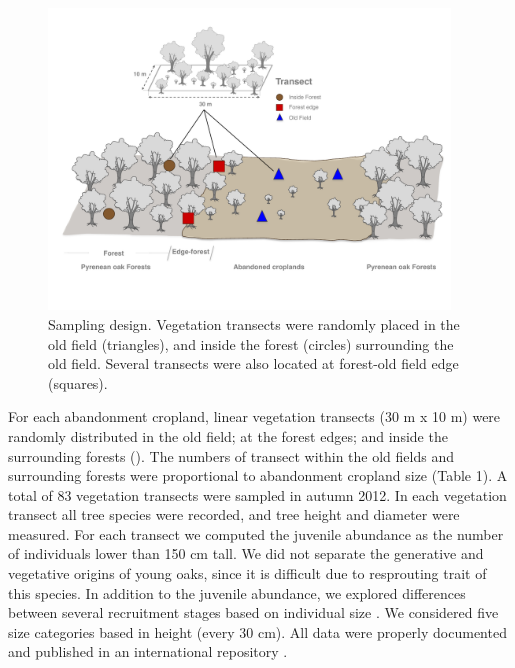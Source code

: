 \begin{figure}
    \centering
    \includegraphics[width=\textwidth,height=8cm,
  keepaspectratio]{img/coloniza/coloniza-transectScheme.pdf}
    \caption{Sampling design. Vegetation transects were randomly placed in the old field (triangles), and inside the forest (circles) surrounding the old field. Several transects were also located at forest-old field edge (squares).}
    \label{fig:coloniza:transects}
\end{figure}

For each abandonment cropland, linear vegetation transects (30 m x 10 m) were randomly distributed in the old field; at the forest edges; and inside the surrounding forests (). The numbers of transect within the old fields and surrounding forests were proportional to abandonment cropland size (Table 1). A total of 83 vegetation transects were sampled in autumn 2012. In each vegetation transect all tree species were recorded, and tree height and diameter were measured. For each transect we computed the juvenile abundance as the number of individuals lower than 150 cm tall. We did not separate the generative and vegetative origins of young oaks, since it is difficult due to resprouting trait of this species. In addition to the juvenile abundance, we explored differences between several recruitment stages based on individual size \autocites[\emph{e.g}][]{Plieningeretal2010LargeScalePatterns}. We considered five size categories based in height (every 30 cm). All data were properly documented and published in an international repository \autocites[see][for a detailed description of the dataset]{PerezLuqueetal2015DatasetMIGRAME}. 

